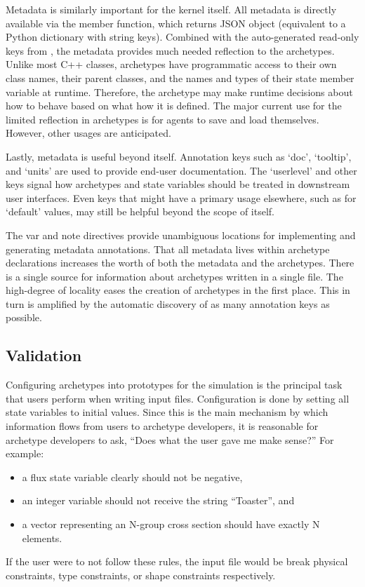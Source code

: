 Metadata is similarly important for the \cyclus kernel itself. All metadata is 
directly available via the  member function, which returns 
\gls{JSON} 
object (equivalent to a Python dictionary with string keys). Combined with the 
auto-generated read-only keys from \cycpp, the metadata provides much needed 
reflection to the archetypes.  Unlike most C++ classes, archetypes have 
programmatic access to their own class names, their parent classes, and the names and 
types of their state member variable at runtime. Therefore, the archetype may 
make runtime decisions about how to behave based on what how it is defined.
The major current use for the limited reflection in archetypes is for agents to 
save and load themselves. However, other usages are anticipated.

Lastly, metadata is useful beyond \cyclus itself. Annotation keys such as `doc',
`tooltip', and `units' are used to provide end-user documentation. The `userlevel'
and other keys signal how archetypes and state variables should be treated in 
downstream user interfaces.  Even keys that might have a primary usage elsewhere, 
such as for `default' values, may still be helpful beyond the scope of \cyclus 
itself.  

The var and note directives provide unambiguous locations for implementing and 
generating metadata annotations. That all metadata lives within archetype 
declarations increases the worth of both the metadata and the archetypes.
There is a single source for information about archetypes written in a single file.
The high-degree of locality eases the creation of archetypes in the first place.
This in turn is amplified by the automatic discovery of as many annotation 
keys as possible.

\subsection{Validation}

Configuring archetypes into prototypes for the simulation is the principal task 
that users perform when writing \cyclus input files. Configuration is done by 
setting all state variables to initial values. Since this is the main mechanism 
by which information flows from users to archetype developers, it is reasonable for
archetype developers to ask, ``Does what the user gave me make sense?'' For example:
\begin{itemize} 
    \item a flux state variable clearly should not be negative, 
    \item an integer variable should not receive the string ``Toaster'', and
    \item a vector representing an N-group cross section should have exactly N 
          elements.
\end{itemize} 
If the user were to not follow these rules, the input file would be break physical
constraints, type constraints, or shape constraints respectively. 

